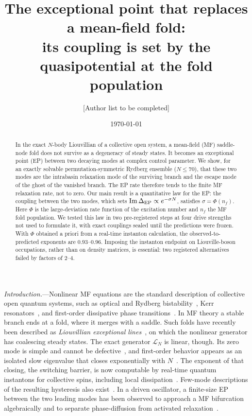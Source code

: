 \documentclass[aps,prl,twocolumn,superscriptaddress,amsmath,amssymb,reprint]{revtex4-2}
\newcommand{\Lc}{\mathcal{L}}
\begin{document}
\title{The exceptional point that replaces a mean-field fold:\\
its coupling is set by the quasipotential at the fold population}

\author{[Author list to be completed]}
\date{\today}

\begin{abstract}
In the exact $N$-body Liouvillian of a collective open system, a mean-field (MF) saddle-node fold does not survive as a degeneracy of steady states. It becomes an exceptional point (EP) between two decaying modes at complex control parameter. We show, for an exactly solvable permutation-symmetric Rydberg ensemble ($N\le70$), that these two modes are the intrabasin relaxation mode of the surviving branch and the escape mode of the ghost of the vanished branch. The EP rate therefore tends to the finite MF relaxation rate, not to zero. Our main result is a quantitative law for the EP: the coupling between the two modes, which sets ${\rm Im}\,\Delta_{\rm EP}\propto e^{-\sigma N}$, satisfies $\sigma=\Phi(n_f)$. Here $\Phi$ is the large-deviation rate function of the excitation number and $n_f$ the MF fold population. We tested this law in two pre-registered steps at four drive strengths not used to formulate it, with exact couplings sealed until the predictions were frozen. With $\Phi$ obtained a priori from a real-time instanton calculation, the observed-to-predicted exponents are $0.93$--$0.96$. Imposing the instanton endpoint on Liouville-boson occupations, rather than on density matrices, is essential: two registered alternatives failed by factors of $2$--$4$.
\end{abstract}

\maketitle

\emph{Introduction.}---Nonlinear MF equations are the standard description of collective open quantum systems, such as optical and Rydberg bistability~\cite{Carr2013,Xie2025}, Kerr resonators~\cite{Casteels2017,Minganti2018}, and first-order dissipative phase transitions~\cite{Minganti2018,Macieszczak2016}. In MF theory a stable branch ends at a fold, where it merges with a saddle. Such folds have recently been described as \emph{Liouvillian exceptional lines}~\cite{Xie2025,SunYi2024}, on which the nonlinear generator has coalescing steady states. The exact generator $\Lc_N$ is linear, though. Its zero mode is simple and cannot be defective~\cite{HuBudich2025}, and first-order behavior appears as an isolated slow eigenvalue that closes exponentially with $N$~\cite{Minganti2018,Casteels2017,Ptaszynski2024,Xiang2026}. The exponent of that closing, the switching barrier, is now computable by real-time quantum instantons for collective spins, including local dissipation~\cite{PCE2026L,CEP2026}. Few-mode descriptions of the resulting hysteresis also exist~\cite{Krimer2019}. In a driven oscillator, a finite-size EP between the two leading modes has been observed to approach a MF bifurcation algebraically and to separate phase-diffusion from activated relaxation~\cite{Cabot2024}.
\end{document}
